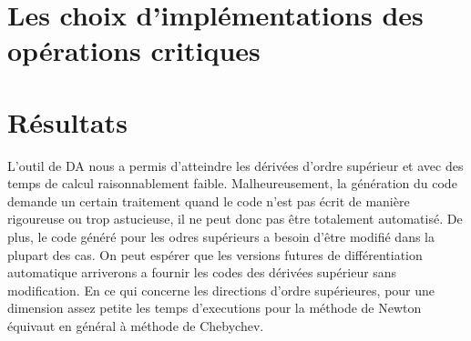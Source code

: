 \documentclass[hypertexte]{scienceUdeS}
\begin{document}
\chapter[Les choix d'implémentations des opérations critiques] 
        {\singlespacing%
         Les choix d'implémentations des opérations critiques}
         \label{ch:chapitre-3}

\chapter[Résultats] 
        {\singlespacing%
         Résultats}
         \label{ch:chapitre-4}




\Conclusion
L'outil de DA nous a permis d'atteindre les dérivées d'ordre supérieur et avec 
des temps de calcul raisonnablement faible. Malheureusement, la génération du code
 demande un certain traitement quand le code n'est pas écrit de manière rigoureuse
 ou trop astucieuse, il ne peut donc pas être totalement automatisé. De plus, le code
généré pour les odres supérieurs a besoin d'être modifié dans la plupart des cas. 
On peut espérer que les versions futures de différentiation automatique arriverons a 
fournir les codes des dérivées supérieur sans modification. 
En ce qui concerne les directions d'ordre supérieures, pour une dimension assez petite 
les temps d'executions pour la méthode de Newton équivaut en général à méthode de 
Chebychev.





\appendix



\end{document}
